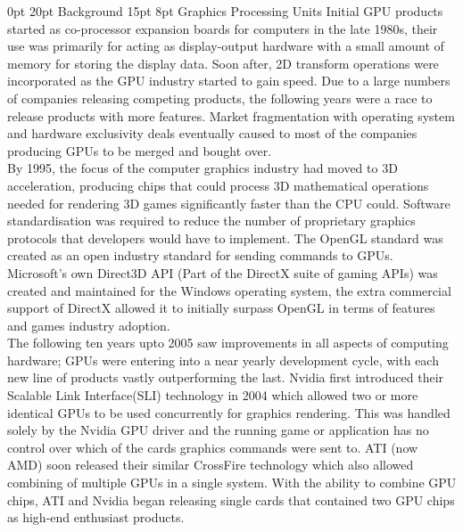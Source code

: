 \documentclass[12pt,a4paper]{article}
\makeatletter
\renewcommand\subsection{\@startsection {subsection}{1}{2mm} %
                               {15pt} %
                               {8pt} %
                               {\fontsize{13pt}{1em}\bfseries}}
\renewcommand\section{\@startsection {section}{1}{0mm} %
                               {0pt} %
                               {20pt} %
                               {\fontsize{14pt}{1em}\bfseries\newpage}}
\makeatother
\begin{document}
\section{Background}
\subsection{Graphics Processing Units}
Initial GPU products started as co-processor expansion boards for computers in the late 1980s, their use was primarily for acting as display-output hardware with a small amount of memory for storing the display data. Soon after, 2D transform operations were incorporated as the GPU industry started to gain speed. Due to a large numbers of companies releasing competing products, the following years were a race to release products with more features. Market fragmentation with operating system and hardware exclusivity deals eventually caused to most of the companies producing GPUs to be merged and bought over.
\\
By 1995, the focus of the computer graphics industry had moved to 3D acceleration, producing chips that could process 3D mathematical operations needed for rendering 3D games significantly faster than the CPU could. Software standardisation was required to reduce the number of proprietary graphics protocols that developers would have to implement. The OpenGL standard was created as an open industry standard for sending commands to GPUs. Microsoft's own Direct3D API (Part of the DirectX suite of gaming APIs) was created and maintained for the Windows operating system, the extra commercial support of DirectX allowed it to initially surpass OpenGL in terms of features and games industry adoption. 
\\
The following ten years upto 2005 saw improvements in all aspects of computing hardware; GPUs were entering into a near yearly development cycle, with each new line of products vastly outperforming the last. Nvidia first introduced their Scalable Link Interface(SLI) technology in 2004 which allowed two or more identical GPUs to be used concurrently for graphics rendering. This was handled solely by the Nvidia GPU driver and the running game or application has no control over which of the cards graphics commands were sent to. ATI (now AMD) soon released their similar CrossFire technology which also allowed combining of multiple GPUs in a single system. With the ability to combine GPU chips, ATI and Nvidia began releasing single cards that contained two GPU chips as high-end enthusiast products.
\\
\end{document}
